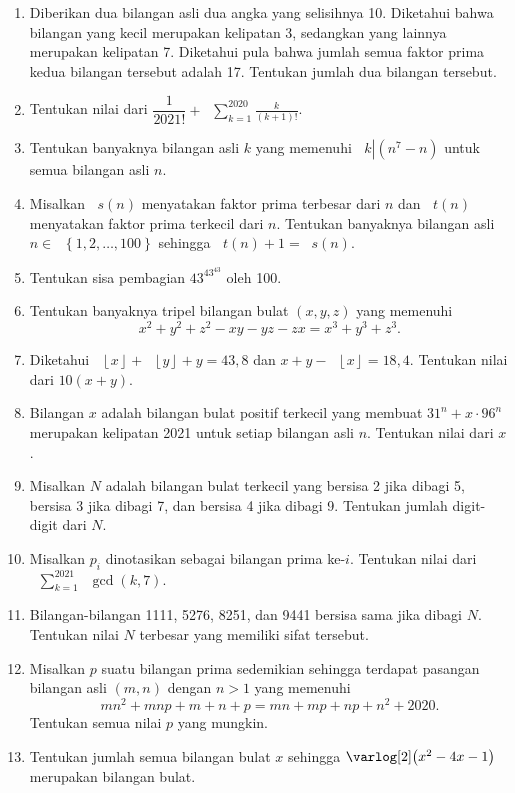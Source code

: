 \documentclass[12pt]{article}
\newcommand*\lrbr[1]{\mathop{}\!\left\lbrace#1\right\rbrace}
\newcommand*\floor[1]{\mathop{}\!\left\lfloor{#1}\right\rfloor}
\newcommand*\func[2]{\mathop{}\!{#1}{\left({#2}\right)}}
\let\log\varlog
\newcommand*\ds[1]{\mathop{}\!\displaystyle{{#1}}}
\newcommand*\divid[2]{\mathop{}\!{#1} \left| {#2} \right.}
\begin{document}
\begin{enumerate}[leftmargin=*]
		\item Diberikan dua bilangan asli dua angka yang selisihnya 10. Diketahui bahwa bilangan yang kecil merupakan kelipatan 3, sedangkan yang lainnya merupakan kelipatan 7. Diketahui pula bahwa jumlah semua faktor prima kedua bilangan tersebut adalah 17. Tentukan jumlah dua bilangan tersebut.
		\item Tentukan nilai dari $ \dfrac{1}{2021!} + \ds{\sum_{k = 1}^{2020}{\frac{k}{\left(k + 1\right)!}}} $.
		\item Tentukan banyaknya bilangan asli $ k $ yang memenuhi $ \divid{k}{\left(n^{7} - n\right)} $ untuk semua bilangan asli $ n $.
		\item Misalkan $ \func{s}{n} $ menyatakan faktor prima terbesar dari $ n $ dan $ \func{t}{n} $ menyatakan faktor prima terkecil dari $ n $. Tentukan banyaknya bilangan asli $ n \in \lrbr{1, 2, \dots, 100} $ sehingga $ \func{t}{n} + 1 = \func{s}{n} $.
		\item Tentukan sisa pembagian $ 43^{43^{43}} $ oleh 100.
		\item Tentukan banyaknya tripel bilangan bulat $ \left(x, y, z\right) $ yang memenuhi
		\[ x^{2} + y^{2} + z^{2} - xy - yz - zx = x^{3} + y^{3} + z^{3}. \]
		\item Diketahui $ \floor{x} + \floor{y} + y = 43,8 $ dan $ x + y - \floor{x} = 18,4 $. Tentukan nilai dari $ 10\left(x + y\right) $.
		\item Bilangan $ x $ adalah bilangan bulat positif terkecil yang membuat $ 31^{n} + x \cdot 96^{n} $ merupakan kelipatan 2021 untuk setiap bilangan asli $ n $. Tentukan nilai dari $ x $.
		\item Misalkan $ N $ adalah bilangan bulat terkecil yang bersisa 2 jika dibagi 5, bersisa 3 jika dibagi 7, dan bersisa 4 jika dibagi 9. Tentukan jumlah digit-digit dari $ N $.
		\item Misalkan $ p_{i} $ dinotasikan sebagai bilangan prima ke-$ i $. Tentukan nilai dari $ \ds{\sum_{k = 1}^{2021}{\func{\gcd}{k, 7}}} $.
		\item Bilangan-bilangan 1111, 5276, 8251, dan 9441 bersisa sama jika dibagi $ N $. Tentukan nilai $ N $ terbesar yang memiliki sifat tersebut.
		\item Misalkan $ p $ suatu bilangan prima sedemikian sehingga terdapat pasangan bilangan asli $ \left(m, n\right) $ dengan $ n > 1 $ yang memenuhi
		\[ mn^{2} + mnp + m + n + p = mn + mp + np + n^{2} + 2020. \]
		Tentukan semua nilai $ p $ yang mungkin.
		\item Tentukan jumlah semua bilangan bulat $ x $ sehingga $ \func{\log[2]}{x^{2} - 4x - 1} $ merupakan bilangan bulat.

\end{enumerate}
\end{document}

